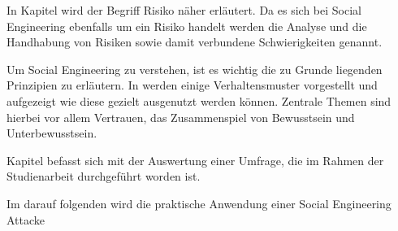 In Kapitel  wird der Begriff Risiko näher erläutert.
Da es sich bei Social Engineering ebenfalls um ein Risiko handelt werden die Analyse und die Handhabung
von Risiken sowie damit verbundene Schwierigkeiten genannt.

Um Social Engineering zu verstehen, ist es wichtig die zu Grunde liegenden Prinzipien zu erläutern.
In  werden einige Verhaltensmuster vorgestellt und aufgezeigt
wie diese gezielt ausgenutzt werden können.
Zentrale Themen sind hierbei vor allem Vertrauen, das Zusammenspiel von Bewusstsein und Unterbewusstsein.

Kapitel  befasst sich mit der Auswertung einer Umfrage, die im Rahmen der
Studienarbeit durchgeführt worden ist.

Im darauf folgenden  wird die praktische Anwendung einer Social Engineering Attacke 
